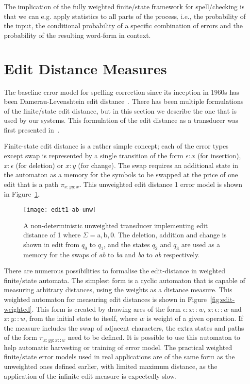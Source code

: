 \documentclass[officiallayout]{unihelcompling}
\begin{document}
The implication of the fully weighted finite\-/state framework for
spell\-/checking is that we can e.g. apply statistics to all parts of the
process, i.e., the probability of the input, the conditional probability of a
specific combination of errors and the probability of the resulting word-form
in context. 

\section{Edit Distance Measures}
\label{sec:edit-distance}

The baseline error model for spelling correction since its inception in 1960s
has been Damerau-Levenshtein edit
distance~\citep{damerau1964technique,levenshtein1966binary}. There has been
multiple formulations of the finite\-/state edit distance, but in this section
we describe the one that is used by our systems. This formulation of the edit
distance as a transducer was first presented
in~\citet{schulz2002fast}.

Finite-state edit distance is a rather simple concept; each of the error types
except swap is represented by a single transition of the form $\epsilon:x$ (for
insertion), $x:\epsilon$ (for deletion) or $x:y$ (for change). The swap
requires an additional state in the automaton as a memory for the symbols to be
swapped at the price of one edit that is a path $\pi_{x:y y:x}$. This
unweighted edit distance 1 error model is shown in Figure~\ref{fig:edit1-ab}.

\begin{figure}
    \texttt{[image: edit1-ab-unw]}
    \caption{A non-deterministic unweighted transducer implementing
        edit distance of 1 where $\Sigma = {\mathrm{a}, \mathrm{b}, 0}$.
        The deletion, addition and change is shown in
        edit from $q_0$ to $q_1$, and the states $q_2$ and $q_3$ are used as a
        memory for the swaps of \emph{ab} to \emph{ba} and \emph{ba} to
        \emph{ab} respectively.  \label{fig:edit1-ab}}
\end{figure}

There are numerous possibilities to formalise the edit-distance in weighted
finite\-/state automata. The simplest form is a cyclic automaton that is
capable of measuring arbitrary distances, using the weights as a distance
measure. This weighted automaton for measuring edit distances is shown in
Figure~\ref{fig:edit-weighted}. This form is created by drawing arcs of the
form $\epsilon:x::w$, $x:\epsilon::w$ and $x:y::w$, from the initial state to
itself, where $w$ is weight of a given operation. If the measure includes the
swap of adjacent characters, the extra states and paths of the form $\pi_{x:y
y:x::w}$ need to be defined. It is possible to use this automaton to help
automatic harvesting or training of error model. The practical weighted
finite\-/state error models used in real applications are of the same form as
the unweighted ones defined earlier, with limited maximum distance, as the
application of the infinite edit measure is expectedly slow.
\end{document}
